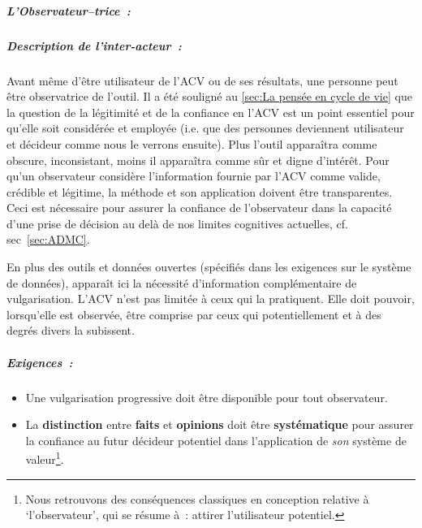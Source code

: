%
% 
\subparagraph{L'Observateur--trice~:}
\subparagraph{Description de l'inter-acteur~:}
 Avant même d'être utilisateur de l'\gls{ACV} ou de ses résultats, une personne peut être observatrice de l'outil.
 Il a été souligné au \ref{sec:La pensée en cycle de vie} que la question de la légitimité et de la confiance en l'\gls{ACV} est un point essentiel pour qu'elle soit considérée et employée (i.e. que des personnes deviennent utilisateur et décideur comme nous le verrons ensuite).
 Plus l'outil apparaîtra comme obscure, inconsistant, moins il apparaîtra comme sûr et digne d'intérêt.
 Pour qu'un observateur considère l'information fournie par l'\gls{ACV} comme valide, crédible et légitime, la méthode et son application doivent être transparentes. Ceci est nécessaire pour assurer la confiance de l'observateur dans la capacité d'une prise de décision au delà de nos limites cognitives actuelles, cf. sec~\ref{sec:ADMC}.

 En plus des outils et données ouvertes (spécifiés dans les exigences sur le système de données), apparaît ici la nécessité d'information complémentaire de vulgarisation.
 L'\gls{ACV} n'est pas limitée à ceux qui la pratiquent.
 Elle doit pouvoir, lorsqu'elle est observée, être comprise par ceux qui potentiellement et à des degrés divers la subissent. %
 
%
%
%
%
 \subparagraph{Exigences~:}
 \begin{itemize}
 \item Une vulgarisation progressive doit être disponible pour tout observateur.
 \item La \textbf{distinction} entre \textbf{faits} et \textbf{opinions} doit être \textbf{systématique} pour assurer la confiance au futur décideur potentiel dans l'application de \emph{son} système de valeur\footnote{Nous retrouvons des conséquences classiques en conception relative à `l'observateur', qui se résume à~: attirer l'utilisateur potentiel.}.
 \end{itemize}
 
